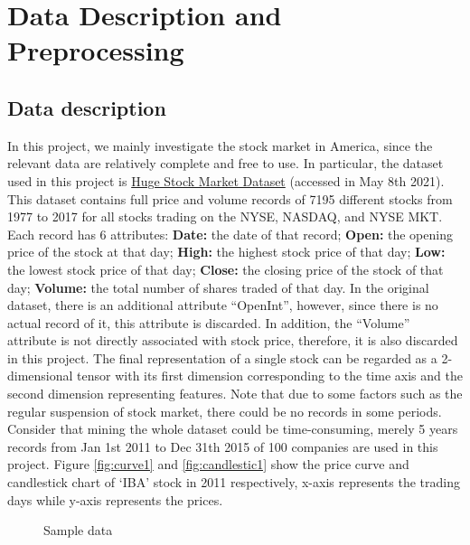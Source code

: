 \chapter{Data Description and Preprocessing}
\label{ch:data}

\section{Data description}
In this project, we mainly investigate the stock market in America, since the relevant data are relatively complete and free to use. In particular, the dataset used in this project is \hyperlink{https://www.kaggle.com/borismarjanovic/price-volume-data-for-all-us-stocks-etfs}{Huge Stock Market Dataset} (accessed in May 8th 2021). This dataset contains full price and volume records of 7195 different stocks from 1977 to 2017 for all stocks trading on the NYSE, NASDAQ, and NYSE MKT. Each record has 6 attributes: \textbf{Date:} the date of that record; \textbf{Open:} the opening price of the stock at that day; \textbf{High:} the highest stock price of that day; \textbf{Low:} the lowest stock price of that day; \textbf{Close:} the closing price of the stock of that day; \textbf{Volume:} the total number of shares traded of that day. In the original dataset, there is an additional attribute ``OpenInt'', however, since there is no actual record of it, this attribute is discarded. In addition, the ``Volume'' attribute is not directly associated with stock price, therefore, it is also discarded in this project. The final representation of a single stock can be regarded as a 2-dimensional tensor with its first dimension corresponding to the time axis and the second dimension representing features. Note that due to some factors such as the regular suspension of stock market, there could be no records in some periods. Consider that mining the whole dataset could be time-consuming, merely 5 years records from Jan 1st 2011 to Dec 31th 2015 of 100 companies are used in this project. Figure \ref{fig:curve1} and \ref{fig:candlestic1} show the price curve and candlestick chart of `IBA' stock in 2011 respectively, x-axis represents the trading days while y-axis represents the prices.
\begin{figure}[!htbp]
    \centering 
    \caption{ Sample data } 
    \label{fig:sample1} 
\end{figure} 

